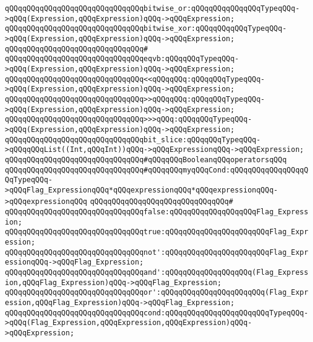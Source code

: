 \verb|qQQqqQQqqQQqqQQqqQQqqQQqqQQqqQQqbitwise_or:qQQqqQQqqQQqqQQqTypeqQQq->qQQq(Expression,qQQqExpression)qQQq->qQQqExpression;|\newline
\verb|qQQqqQQqqQQqqQQqqQQqqQQqqQQqqQQqbitwise_xor:qQQqqQQqqQQqTypeqQQq->qQQq(Expression,qQQqExpression)qQQq->qQQqExpression;|\newline
\verb|qQQqqQQqqQQqqQQqqQQqqQQqqQQqqQQq#|\newline
\verb|qQQqqQQqqQQqqQQqqQQqqQQqqQQqqQQqeqvb:qQQqqQQqTypeqQQq->qQQq(Expression,qQQqExpression)qQQq->qQQqExpression;|\newline
\verb|qQQqqQQqqQQqqQQqqQQqqQQqqQQqqQQq<<qQQqqQQq:qQQqqQQqTypeqQQq->qQQq(Expression,qQQqExpression)qQQq->qQQqExpression;|\newline
\verb|qQQqqQQqqQQqqQQqqQQqqQQqqQQqqQQq>>qQQqqQQq:qQQqqQQqTypeqQQq->qQQq(Expression,qQQqExpression)qQQq->qQQqExpression;|\newline
\verb|qQQqqQQqqQQqqQQqqQQqqQQqqQQqqQQq>>>qQQq:qQQqqQQqTypeqQQq->qQQq(Expression,qQQqExpression)qQQq->qQQqExpression;|\newline
\newline
\verb|qQQqqQQqqQQqqQQqqQQqqQQqqQQqqQQqbit_slice:qQQqqQQqTypeqQQq->qQQqqQQqList((Int,qQQqInt))qQQq->qQQqExpressionqQQq->qQQqExpression;|\newline
\newline
\verb|qQQqqQQqqQQqqQQqqQQqqQQqqQQqqQQq#qQQqqQQqBooleanqQQqoperatorsqQQq|\newline
\verb|qQQqqQQqqQQqqQQqqQQqqQQqqQQqqQQq#qQQqqQQqmyqQQqCond:qQQqqQQqqQQqqQQqqQQqTypeqQQq->qQQqFlag_ExpressionqQQq*qQQqexpressionqQQq*qQQqexpressionqQQq->qQQqexpressionqQQq|\newline
\verb|qQQqqQQqqQQqqQQqqQQqqQQqqQQqqQQq#|\newline
\verb|qQQqqQQqqQQqqQQqqQQqqQQqqQQqqQQqfalse:qQQqqQQqqQQqqQQqqQQqFlag_Expression;|\newline
\verb|qQQqqQQqqQQqqQQqqQQqqQQqqQQqqQQqtrue:qQQqqQQqqQQqqQQqqQQqqQQqFlag_Expression;|\newline
\verb|qQQqqQQqqQQqqQQqqQQqqQQqqQQqqQQqnot':qQQqqQQqqQQqqQQqqQQqqQQqFlag_ExpressionqQQq->qQQqFlag_Expression;|\newline
\verb|qQQqqQQqqQQqqQQqqQQqqQQqqQQqqQQqand':qQQqqQQqqQQqqQQqqQQq(Flag_Expression,qQQqFlag_Expression)qQQq->qQQqFlag_Expression;|\newline
\verb|qQQqqQQqqQQqqQQqqQQqqQQqqQQqqQQqor':qQQqqQQqqQQqqQQqqQQqqQQq(Flag_Expression,qQQqFlag_Expression)qQQq->qQQqFlag_Expression;|\newline
\verb|qQQqqQQqqQQqqQQqqQQqqQQqqQQqqQQqcond:qQQqqQQqqQQqqQQqqQQqqQQqTypeqQQq->qQQq(Flag_Expression,qQQqExpression,qQQqExpression)qQQq->qQQqExpression;|\newline
